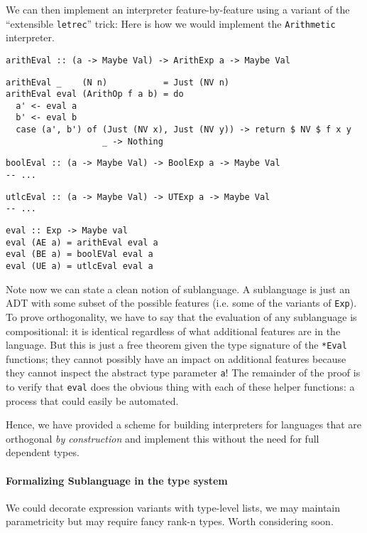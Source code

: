 \documentclass[12pt]{article}
\begin{document}
We can then implement an interpreter feature-by-feature using a variant of the ``extensible
\verb|letrec|'' trick: Here is how we would implement the \texttt{Arithmetic} interpreter.

\begin{verbatim}
arithEval :: (a -> Maybe Val) -> ArithExp a -> Maybe Val
\end{verbatim}
\begin{verbatim}
arithEval _    (N n)           = Just (NV n)
arithEval eval (ArithOp f a b) = do 
  a' <- eval a
  b' <- eval b
  case (a', b') of (Just (NV x), Just (NV y)) -> return $ NV $ f x y
                   _ -> Nothing
\end{verbatim}
\begin{verbatim}
boolEval :: (a -> Maybe Val) -> BoolExp a -> Maybe Val
-- ...
\end{verbatim}
\begin{verbatim}
utlcEval :: (a -> Maybe Val) -> UTExp a -> Maybe Val
-- ...
\end{verbatim}
\begin{verbatim}
eval :: Exp -> Maybe val
eval (AE a) = arithEval eval a
eval (BE a) = boolEVal eval a
eval (UE a) = utlcEval eval a
\end{verbatim}

Note now we can state a clean notion of sublanguage. A sublanguage is just an
ADT with some subset of the possible features (i.e. some of the variants of
\texttt{Exp}). To prove orthogonality, we have to say that the evaluation of any
sublanguage is compositional: it is identical regardless of what additional
features are in the language. But this is just a free theorem given the type
signature of the \texttt{*Eval} functions; they cannot possibly have an impact
on additional features because they cannot inspect the abstract type parameter
\texttt{a}! The remainder of the proof is to verify that \texttt{eval} does the
obvious thing with each of these helper functions: a process that could easily
be automated.

Hence, we have provided a scheme for building interpreters for languages that
are orthogonal \emph{by construction} and implement this without the need for
full dependent types.

\paragraph{Formalizing Sublanguage in the type system} We could decorate
expression variants with type-level lists, we may maintain parametricity but may
require fancy rank-n types. Worth considering soon.
\end{document}
